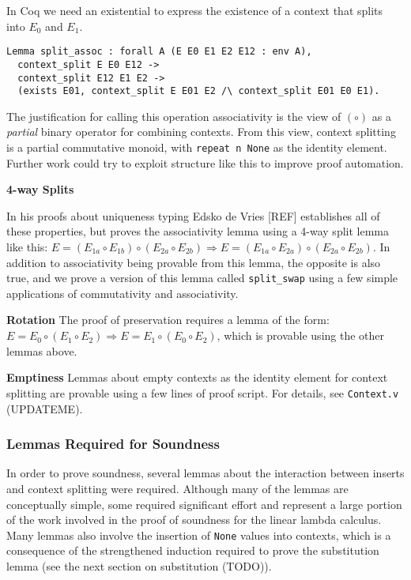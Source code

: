 \documentclass[]{unswthesis}
\let\c\texttt
\let\i\textit
\begin{document}
In Coq we need an existential to express the existence of a context that splits into $E_0$ and $E_1$.

\begin{verbatim}
Lemma split_assoc : forall A (E E0 E1 E2 E12 : env A),
  context_split E E0 E12 ->
  context_split E12 E1 E2 ->
  (exists E01, context_split E E01 E2 /\ context_split E01 E0 E1).
\end{verbatim}

The justification for calling this operation associativity is the view of $(\circ)$ as a \i{partial} binary operator for combining contexts. From this view, context splitting is a partial commutative monoid, with \c{repeat n None} as the identity element. Further work could try to exploit structure like this to improve proof automation.

\textbf{4-way Splits}

In his proofs about uniqueness typing Edsko de Vries [REF] establishes all of these properties, but proves the associativity lemma using a 4-way split lemma like this: $E = (E_{1a} \circ E_{1b}) \circ (E_{2a} \circ E_{2b}) \Rightarrow E = (E_{1a} \circ E_{2a}) \circ (E_{2a} \circ E_{2b})$. In addition to associativity being provable from this lemma, the opposite is also true, and we prove a version of this lemma called \c{split_swap} using a few simple applications of commutativity and associativity.

\textbf{Rotation} The proof of preservation requires a lemma of the form: $E = E_0 \circ (E_1 \circ E_2) \Rightarrow E = E_1 \circ (E_0 \circ E_2)$, which is provable using the other lemmas above.

\textbf{Emptiness} Lemmas about empty contexts as the identity element for context splitting are provable using a few lines of proof script. For details, see \c{Context.v} (UPDATEME).


\subsubsection{Lemmas Required for Soundness}

In order to prove soundness, several lemmas about the interaction between inserts and context splitting were required. Although many of the lemmas are conceptually simple, some required significant effort and represent a large portion of the work involved in the proof of soundness for the linear lambda calculus. Many lemmas also involve the insertion of \c{None} values into contexts, which is a consequence of the strengthened induction required to prove the substitution lemma (see the next section on substitution (TODO)).
\end{document}

